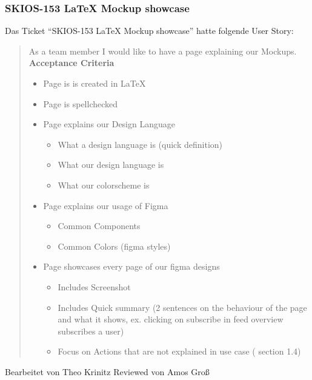 \subsubsection{SKIOS-153 LaTeX Mockup showcase}
Das Ticket \enquote{SKIOS-153 LaTeX Mockup showcase} hatte folgende User Story:
\begin{quotation}
    As a team member I would like to have a page explaining our Mockups. \\
\textbf{Acceptance Criteria}
\begin{itemize}
    \item Page is is created in LaTeX
    \item Page is spellchecked
    \item Page explains our Design Language
    \begin{itemize}
        \item What a design language is (quick definition)
        \item What our design language is
        \item What our colorscheme is
    \end{itemize}
    \item Page explains our usage of Figma
    \begin{itemize}
        \item Common Components
        \item Common Colors (figma styles)
    \end{itemize}
    \item Page showcases every page of our figma designs
    \begin{itemize}
        \item Includes Screenshot
        \item Includes Quick summary (2 sentences on the behaviour of the page and what it shows, ex. clicking on subscribe in feed overview subscribes a user) 
        \item Focus on Actions that are not explained in use case ( section 1.4)
    \end{itemize}
\end{itemize}
\end{quotation}
Bearbeitet von Theo Krinitz
Reviewed von Amos Groß

